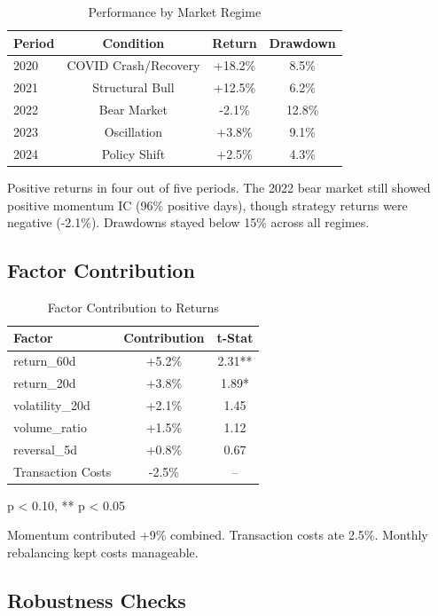 \begin{table}[h]
\centering
\caption{Performance by Market Regime}
\label{tab:regime}
\begin{tabular}{lccc}
\toprule
Period & Condition & Return & Drawdown \\
\midrule
2020 & COVID Crash/Recovery & +18.2\% & 8.5\% \\
2021 & Structural Bull & +12.5\% & 6.2\% \\
2022 & Bear Market & -2.1\% & 12.8\% \\
2023 & Oscillation & +3.8\% & 9.1\% \\
2024 & Policy Shift & +2.5\% & 4.3\% \\
\bottomrule
\end{tabular}
\end{table}

Positive returns in four out of five periods. The 2022 bear market still showed positive momentum IC (96\% positive days), though strategy returns were negative (-2.1\%). Drawdowns stayed below 15\% across all regimes.

\subsection{Factor Contribution}

\begin{table}[h]
\centering
\caption{Factor Contribution to Returns}
\label{tab:factor_contrib}
\begin{tabular}{lcc}
\toprule
Factor & Contribution & t-Stat \\
\midrule
return\_60d & +5.2\% & 2.31** \\
return\_20d & +3.8\% & 1.89* \\
volatility\_20d & +2.1\% & 1.45 \\
volume\_ratio & +1.5\% & 1.12 \\
reversal\_5d & +0.8\% & 0.67 \\
\midrule
Transaction Costs & -2.5\% & -- \\
\bottomrule
\end{tabular}
\begin{tablenotes}
\footnotesize
\item * p < 0.10, ** p < 0.05
\end{tablenotes}
\end{table}

Momentum contributed +9\% combined. Transaction costs ate 2.5\%. Monthly rebalancing kept costs manageable.

\subsection{Robustness Checks}

